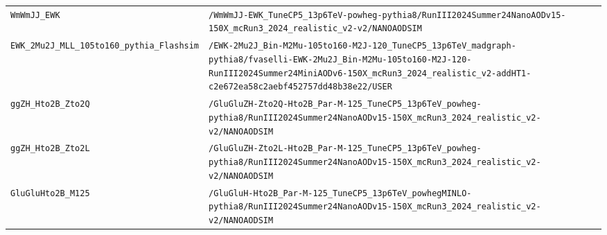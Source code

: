\begin{longtable}{@{}>{\RaggedRight\arraybackslash}p{} >{\RaggedRight\arraybackslash}p{}@{}}
\addlinespace[2pt]
\texttt{WmWmJJ\_\allowbreak{}EWK} & \texttt{/\allowbreak{}WmWmJJ-\allowbreak{}EWK\_\allowbreak{}TuneCP5\_\allowbreak{}13p6TeV-\allowbreak{}powheg-\allowbreak{}pythia8/\allowbreak{}RunIII2024Summer24NanoAODv15-\allowbreak{}150X\_\allowbreak{}mcRun3\_\allowbreak{}2024\_\allowbreak{}realistic\_\allowbreak{}v2-\allowbreak{}v2/\allowbreak{}NANOAODSIM} \\
\addlinespace[2pt]
\texttt{EWK\_\allowbreak{}2Mu2J\_\allowbreak{}MLL\_\allowbreak{}105to160\_\allowbreak{}pythia\_\allowbreak{}Flashsim} & \texttt{/\allowbreak{}EWK-\allowbreak{}2Mu2J\_\allowbreak{}Bin-\allowbreak{}M2Mu-\allowbreak{}105to160-\allowbreak{}M2J-\allowbreak{}120\_\allowbreak{}TuneCP5\_\allowbreak{}13p6TeV\_\allowbreak{}madgraph-\allowbreak{}pythia8/\allowbreak{}fvaselli-\allowbreak{}EWK-\allowbreak{}2Mu2J\_\allowbreak{}Bin-\allowbreak{}M2Mu-\allowbreak{}105to160-\allowbreak{}M2J-\allowbreak{}120-\allowbreak{}RunIII2024Summer24MiniAODv6-\allowbreak{}150X\_\allowbreak{}mcRun3\_\allowbreak{}2024\_\allowbreak{}realistic\_\allowbreak{}v2-\allowbreak{}addHT1-\allowbreak{}c2e672ea58c2aebf452757dd48b38e22/\allowbreak{}USER} \\
\addlinespace[2pt]
\texttt{ggZH\_\allowbreak{}Hto2B\_\allowbreak{}Zto2Q} & \texttt{/\allowbreak{}GluGluZH-\allowbreak{}Zto2Q-\allowbreak{}Hto2B\_\allowbreak{}Par-\allowbreak{}M-\allowbreak{}125\_\allowbreak{}TuneCP5\_\allowbreak{}13p6TeV\_\allowbreak{}powheg-\allowbreak{}pythia8/\allowbreak{}RunIII2024Summer24NanoAODv15-\allowbreak{}150X\_\allowbreak{}mcRun3\_\allowbreak{}2024\_\allowbreak{}realistic\_\allowbreak{}v2-\allowbreak{}v2/\allowbreak{}NANOAODSIM} \\
\addlinespace[2pt]
\texttt{ggZH\_\allowbreak{}Hto2B\_\allowbreak{}Zto2L} & \texttt{/\allowbreak{}GluGluZH-\allowbreak{}Zto2L-\allowbreak{}Hto2B\_\allowbreak{}Par-\allowbreak{}M-\allowbreak{}125\_\allowbreak{}TuneCP5\_\allowbreak{}13p6TeV\_\allowbreak{}powheg-\allowbreak{}pythia8/\allowbreak{}RunIII2024Summer24NanoAODv15-\allowbreak{}150X\_\allowbreak{}mcRun3\_\allowbreak{}2024\_\allowbreak{}realistic\_\allowbreak{}v2-\allowbreak{}v2/\allowbreak{}NANOAODSIM} \\
\addlinespace[2pt]
\texttt{GluGluHto2B\_\allowbreak{}M125} & \texttt{/\allowbreak{}GluGluH-\allowbreak{}Hto2B\_\allowbreak{}Par-\allowbreak{}M-\allowbreak{}125\_\allowbreak{}TuneCP5\_\allowbreak{}13p6TeV\_\allowbreak{}powhegMINLO-\allowbreak{}pythia8/\allowbreak{}RunIII2024Summer24NanoAODv15-\allowbreak{}150X\_\allowbreak{}mcRun3\_\allowbreak{}2024\_\allowbreak{}realistic\_\allowbreak{}v2-\allowbreak{}v2/\allowbreak{}NANOAODSIM} \\

\end{longtable}
